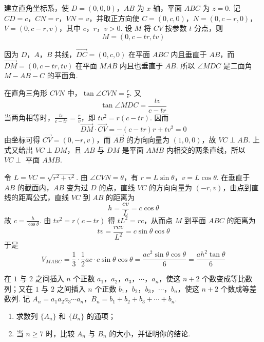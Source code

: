 \begin{solution}
建立直角坐标系，使 \(D=(0,0,0)\)，\(AB\) 为 \(x\) 轴，平面 \(ABC\) 为 \(z=0\). 记 \(CD=c\)，\(CN=r\)，\(VN=v\)，并取正方向使 \(C=(0,c,0)\)，\(N=(0,c-r,0)\)，\(V=(0,c-r,v)\)，其中 \(c\)，\(r\)，\(v>0\). 设 \(M\) 将 \(CV\) 按参数 \(t\) 分点，则
\[
M=(0,c-tr,tv)
\]

因为 \(D\)，\(A\)，\(B\) 共线，\(\overrightarrow{DC}=(0,c,0)\) 在平面 \(ABC\) 内且垂直于 \(AB\)，而 \(\overrightarrow{DM}=(0,c-tr,tv)\) 在平面 \(MAB\) 内且也垂直于 \(AB\). 所以 \(\angle MDC\) 是二面角 \(M-AB-C\) 的平面角.

在直角三角形 \(CVN\) 中，\(\tan\angle CVN=\frac rv\). 又
\[
\tan\angle MDC=\frac{tv}{c-tr}
\]
当两角相等时，\(\frac{tv}{c-tr}=\frac rv\)，即 \(tv^2=r(c-tr)\). 因而
\[
\overrightarrow{DM}\cdot\overrightarrow{CV}=-(c-tr)r+tv^2=0
\]
由坐标可得 \(\overrightarrow{CV}=(0,-r,v)\)，而 \(\overrightarrow{AB}\) 的方向向量为 \((1,0,0)\)，故 \(VC\perp AB\). 上式又给出 \(VC\perp DM\)，且 \(AB\) 与 \(DM\) 是平面 \(AMB\) 内相交的两条直线，所以 \(VC\perp\) 平面 \(AMB\).

令 \(L=VC=\sqrt{r^2+v^2}\). 由 \(\angle CVN=\theta\)，有 \(r=L\sin\theta\)，\(v=L\cos\theta\). 在垂直于 \(AB\) 的截面内，\(AB\) 变为过 \(D\) 的点，直线 \(VC\) 的方向向量为 \((-r,v)\)，由点到直线的距离公式，直线 \(VC\) 到 \(AB\) 的距离为
\[
h=\frac{cv}{L}=c\cos\theta
\]
故 \(c=\frac{h}{\cos\theta}\). 由 \(tv^2=r(c-tr)\) 得 \(tL^2=rc\)，从而点 \(M\) 到平面 \(ABC\) 的距离为
\[
tv=\frac{rcv}{L^2}=c\sin\theta\cos\theta
\]
于是
\[
V_{MABC}=\frac13\cdot\frac12ac\cdot c\sin\theta\cos\theta=\frac{ac^2\sin\theta\cos\theta}{6}=\frac{ah^2\tan\theta}{6}
\]
\end{solution}

\begin{problem}
在 \(1\) 与 \(2\) 之间插入 \(n\) 个正数 \(a_{1}\)，\(a_{2}\)，\(a_{3}\)，\(\cdots\)，\(a_{n}\)，使这 \(n+2\) 个数变成等比数列；又在 \(1\) 与 \(2\) 之间插入 \(n\) 个正数 \(b_{1}\)，\(b_{2}\)，\(b_{3}\)，\(\cdots\)，\(b_{n}\)，使这 \(n+2\) 个数成等差数列. 记 \(A_{n} = a_{1}a_{2}a_{3} \cdots a_{n}\)，\(B_{n} = b_{1} + b_{2} + b_{3} + \cdots + b_{n}\).
\begin{enumerate}
\item 求数列 \(\{A_{n}\}\) 和 \(\{B_{n}\}\) 的通项；
\item 当 \(n \geqslant 7\) 时，比较 \(A_{n}\) 与 \(B_{n}\) 的大小，并证明你的结论.
\end{enumerate}
\end{problem}

